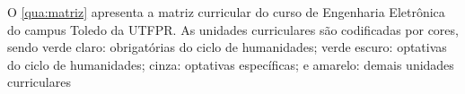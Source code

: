 



O \autoref{qua:matriz} apresenta a matriz curricular do curso de Engenharia Eletrônica do campus Toledo da UTFPR. As unidades curriculares são codificadas por cores, sendo verde claro: obrigatórias do ciclo de humanidades; verde escuro: optativas do ciclo de humanidades; cinza: optativas específicas; e amarelo: demais unidades curriculares %


